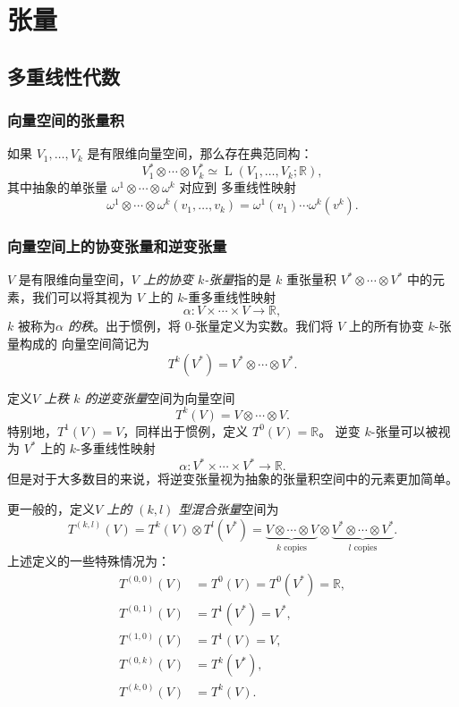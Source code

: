\documentclass[fontset=none]{Notes}
\DeclareMathOperator\LL{L}
\begin{document}
\chapter{张量}

\section{多重线性代数}

\subsection{向量空间的张量积}

\begin{proposition}
  如果 $V_1,\dots,V_k$ 是有限维向量空间，那么存在典范同构：
  \[
    V_1^*\otimes \cdots\otimes V_k^*\simeq \LL(V_1,\dots,V_k;\mathbb{R}),
  \]
  其中抽象的单张量 $\omega^1\otimes \cdots\otimes\omega^k$ 对应到
  多重线性映射
  \[
    \omega^1\otimes\cdots\otimes\omega^k(v_1,\dots,v_k)=
    \omega^1(v_1)\cdots \omega^k(v^k).  
  \]
\end{proposition}

\subsection{向量空间上的协变张量和逆变张量}

$V$ 是有限维向量空间，\emph{$V$ 上的协变 $k$-张量}指的是
$k$ 重张量积 $V^*\otimes\cdots\otimes V^*$ 中的元素，我们可以将其视为
$V$ 上的 $k$-重多重线性映射
\[
  \alpha:V\times\cdots\times V\to \mathbb{R},
\]
$k$ 被称为\emph{$\alpha$ 的秩}。出于惯例，将 $0$-张量定义为实数。我们将 $V$ 上的所有协变 $k$-张量构成的
向量空间简记为
\[
  T^k(V^*)=V^*\otimes\cdots\otimes V^*.
\]

定义\emph{$V$ 上秩 $k$ 的逆变张量}空间为向量空间
\[
  T^k(V)=V\otimes \cdots\otimes V.  
\]
特别地，$T^1(V)=V$，同样出于惯例，定义 $T^0(V)=\mathbb{R}$。
逆变 $k$-张量可以被视为 $V^*$ 上的 $k$-多重线性映射
\[
  \alpha:V^*\times \cdots\times V^*\to \mathbb{R} . 
\]
但是对于大多数目的来说，将逆变张量视为抽象的张量积空间中的元素更加简单。

更一般的，定义\emph{$V$ 上的 $(k,l)$ 型混合张量}空间为
\[
  T^{(k,l)}(V)=T^k(V)\otimes T^l(V^*)=\underbrace{V\otimes\cdots\otimes V}_{\text{$k$ copies}}  
  \otimes \underbrace{V^*\otimes\cdots\otimes V^*}_{\text{$l$ copies}}.
\]
上述定义的一些特殊情况为：
\begin{align*}
  T^{(0,0)}(V)&=T^0(V)=T^0(V^*)=\mathbb{R},\\
  T^{(0,1)}(V)&=T^1(V^*)=V^*,\\
  T^{(1,0)}(V)&=T^1(V)=V,\\
  T^{(0,k)}(V)&=T^k(V^*),\\
  T^{(k,0)}(V)&=T^k(V).
\end{align*}
\end{document}
